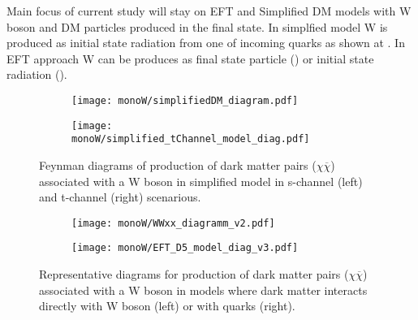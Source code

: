 Main focus of current study will stay on EFT and Simplified DM models with W boson and DM particles produced in the final state. 
In simplfied model W is produced as initial state radiation from one of incoming quarks as shown at . 
In EFT approach W can be produces as final state particle () or initial state radiation ().









\begin{figure}[hb]

\centering
\begin{subfigure}{.5\textwidth}
  \centering
  \texttt{[image: monoW/simplifiedDM\_diagram.pdf]}
\end{subfigure}%
\begin{subfigure}{.5\textwidth}
  \centering
  \texttt{[image: monoW/simplified\_tChannel\_model\_diag.pdf]}
\end{subfigure}
  \caption{Feynman diagrams of production of dark matter pairs ($\chi\overline{\chi}$) associated with a W boson in simplified model 
	   in s-channel (left) and t-channel (right) scenarious.}
  \label{fig:feynMonoWSimple}
\end{figure}


\begin{figure}[hb]

\centering
\begin{subfigure}{.5\textwidth}
  \centering
  \texttt{[image: monoW/WWxx\_diagramm\_v2.pdf]}
\end{subfigure}%
\begin{subfigure}{.5\textwidth}
  \centering
  \texttt{[image: monoW/EFT\_D5\_model\_diag\_v3.pdf]}
\end{subfigure}
  \caption{Representative diagrams for production of dark matter pairs ($\chi\overline{\chi}$) associated with a W boson in models where
dark matter interacts directly with W boson (left) or with quarks (right).}
  \label{fig:feynMonoWEFT}
\end{figure}

